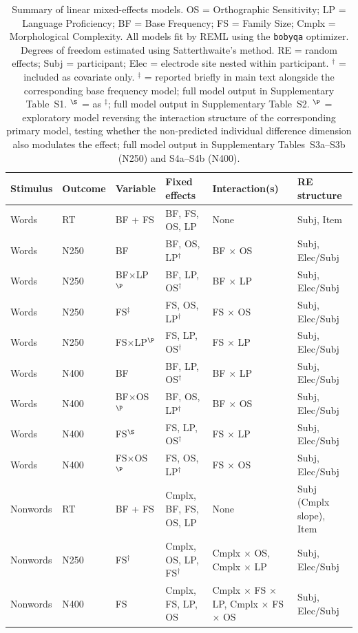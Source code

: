 \documentclass[utf8]{FrontiersinHarvard} %
\begin{document}
	\begin{table}[h!]
		\centering
		\small
		\renewcommand{\arraystretch}{1.4}
		\caption{Summary of linear mixed-effects models. OS = Orthographic Sensitivity; LP = Language Proficiency; BF = Base Frequency; FS = Family Size; Cmplx = Morphological Complexity. All models fit by REML using the \texttt{bobyqa} optimizer. Degrees of freedom estimated using Satterthwaite's method. RE = random effects; Subj = participant; Elec = electrode site nested within participant. $^\dagger$ = included as covariate only. $^\ddagger$ = reported briefly in main text alongside the corresponding base frequency model; full model output in Supplementary Table~S1. $^\S$ = as $^\ddagger$; full model output in Supplementary Table~S2. $^\P$ = exploratory model reversing the interaction structure of the corresponding primary model, testing whether the non-predicted individual difference dimension also modulates the effect; full model output in Supplementary Tables~S3a--S3b (N250) and S4a--S4b (N400).}
		\label{tab:models}
		\begin{tabular}{p{1.6cm} p{1.2cm} p{1.3cm} p{3.8cm} p{3.2cm} p{2.5cm}}
			\toprule
			\textbf{Stimulus} & \textbf{Outcome} & \textbf{Variable} & 
			\textbf{Fixed effects} & \textbf{Interaction(s)} & 
			\textbf{RE structure} \\
			\midrule
			Words & RT & BF + FS & BF, FS, OS, LP & None & Subj, Item \\
			Words & N250 & BF & BF, OS, LP$^\dagger$ & BF $\times$ OS & Subj, Elec/Subj \\
			Words & N250 & BF$\times$LP$^\P$ & BF, LP, OS$^\dagger$ & BF $\times$ LP & Subj, Elec/Subj \\
			Words & N250 & FS$^\ddagger$ & FS, OS, LP$^\dagger$ & FS $\times$ OS & Subj, Elec/Subj \\
			Words & N250 & FS$\times$LP$^\P$ & FS, LP, OS$^\dagger$ & FS $\times$ LP & Subj, Elec/Subj \\
			Words & N400 & BF & BF, LP, OS$^\dagger$ & BF $\times$ LP & Subj, Elec/Subj \\
			Words & N400 & BF$\times$OS$^\P$ & BF, OS, LP$^\dagger$ & BF $\times$ OS & Subj, Elec/Subj \\
			Words & N400 & FS$^\S$ & FS, LP, OS$^\dagger$ & FS $\times$ LP & Subj, Elec/Subj \\
			Words & N400 & FS$\times$OS$^\P$ & FS, OS, LP$^\dagger$ & FS $\times$ OS & Subj, Elec/Subj \\
			Nonwords & RT & BF + FS & Cmplx, BF, FS, OS, LP & None & Subj (Cmplx slope), Item \\
			Nonwords & N250 & FS$^\dagger$ & Cmplx, OS, LP, FS$^\dagger$ & Cmplx $\times$ OS, Cmplx $\times$ LP & Subj, Elec/Subj \\
			Nonwords & N400 & FS & Cmplx, FS, LP, OS & Cmplx $\times$ FS $\times$ LP, Cmplx $\times$ FS $\times$ OS & Subj, Elec/Subj \\
			\bottomrule
		\end{tabular}
	\end{table}
	
\end{document}
